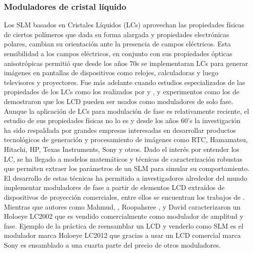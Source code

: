 \subsubsection{Moduladores de cristal líquido}
Los SLM basados en Cristales Líquidos (LCs) aprovechan las propiedades
físicas de ciertos polímeros que dada su forma alargada y propiedades
electrónicas polares, cambian su orientación ante la presencia de
campos eléctricos.  Esta sensibilidad a los campos eléctricos, en
conjunto con sus propiedades ópticas anisotrópicas permitió que desde
los años 70s se implementaran LCs para generar imágenes en pantallas de
dispositivos como relojes, calculadoras y luego televisores y
proyectores. Fue más adelante cuando estudios especializados de las
propiedades de los LCs como los realizados por
 y , y experimentos como los de
 demostraron que los LCD pueden ser usados
como moduladores de solo fase. Aunque la aplicación de LCs para
modulación de fase es relativamente reciente, el estudio de sus
propiedades físicas no lo es y desde los años 60’s la investigación ha
sido respaldada por grandes empresas interesadas en desarrollar
productos tecnológicos de generación y procesamiento de imágenes como
RTC, Hamamatsu, Hitachi, HP, Texas Instruments, Sony y otros. Dado
el interés por entender los LC, se ha llegado a modelos matemáticos y  técnicas de  
caracterización robustas que permiten extraer los parámetros de un SLM para
 simular su comportamiento. 
El desarrollo de estas técnicas ha permitido a investigadores 
alrededor del mundo implementar moduladores de fase a
partir de elementos LCD extraídos de dispositivos de proyección
comerciales, entre ellos se encuentran los trabajos de
. Mientras
que autores como Mahmud, , Roopahsree
, y David 
caracterizaron un Holoeye LC2002 que es vendido comercialmente como
modulador de amplitud y fase.
Ejemplo de la práctica de reensamblar un LCD y venderlo como SLM es el
modulador marca Holoeye LC2012 que gracias a usar un LCD comercial
marca Sony es ensamblado a una cuarta parte del precio de otros
moduladores. 

